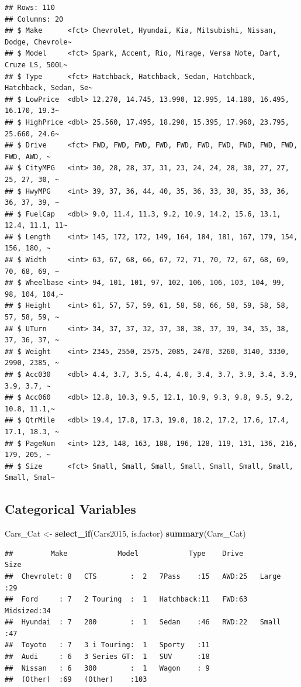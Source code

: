 \documentclass[]{book}
\newenvironment{Shaded}{\begin{snugshade}}{\end{snugshade}}
\newcommand{\KeywordTok}[1]{\textcolor[rgb]{0.13,0.29,0.53}{\textbf{#1}}}
\newcommand{\StringTok}[1]{\textcolor[rgb]{0.31,0.60,0.02}{#1}}
\newcommand{\NormalTok}[1]{#1}
\begin{document}
\begin{verbatim}
## Rows: 110
## Columns: 20
## $ Make      <fct> Chevrolet, Hyundai, Kia, Mitsubishi, Nissan, Dodge, Chevrole~
## $ Model     <fct> Spark, Accent, Rio, Mirage, Versa Note, Dart, Cruze LS, 500L~
## $ Type      <fct> Hatchback, Hatchback, Sedan, Hatchback, Hatchback, Sedan, Se~
## $ LowPrice  <dbl> 12.270, 14.745, 13.990, 12.995, 14.180, 16.495, 16.170, 19.3~
## $ HighPrice <dbl> 25.560, 17.495, 18.290, 15.395, 17.960, 23.795, 25.660, 24.6~
## $ Drive     <fct> FWD, FWD, FWD, FWD, FWD, FWD, FWD, FWD, FWD, FWD, FWD, AWD, ~
## $ CityMPG   <int> 30, 28, 28, 37, 31, 23, 24, 24, 28, 30, 27, 27, 25, 27, 30, ~
## $ HwyMPG    <int> 39, 37, 36, 44, 40, 35, 36, 33, 38, 35, 33, 36, 36, 37, 39, ~
## $ FuelCap   <dbl> 9.0, 11.4, 11.3, 9.2, 10.9, 14.2, 15.6, 13.1, 12.4, 11.1, 11~
## $ Length    <int> 145, 172, 172, 149, 164, 184, 181, 167, 179, 154, 156, 180, ~
## $ Width     <int> 63, 67, 68, 66, 67, 72, 71, 70, 72, 67, 68, 69, 70, 68, 69, ~
## $ Wheelbase <int> 94, 101, 101, 97, 102, 106, 106, 103, 104, 99, 98, 104, 104,~
## $ Height    <int> 61, 57, 57, 59, 61, 58, 58, 66, 58, 59, 58, 58, 57, 58, 59, ~
## $ UTurn     <int> 34, 37, 37, 32, 37, 38, 38, 37, 39, 34, 35, 38, 37, 36, 37, ~
## $ Weight    <int> 2345, 2550, 2575, 2085, 2470, 3260, 3140, 3330, 2990, 2385, ~
## $ Acc030    <dbl> 4.4, 3.7, 3.5, 4.4, 4.0, 3.4, 3.7, 3.9, 3.4, 3.9, 3.9, 3.7, ~
## $ Acc060    <dbl> 12.8, 10.3, 9.5, 12.1, 10.9, 9.3, 9.8, 9.5, 9.2, 10.8, 11.1,~
## $ QtrMile   <dbl> 19.4, 17.8, 17.3, 19.0, 18.2, 17.2, 17.6, 17.4, 17.1, 18.3, ~
## $ PageNum   <int> 123, 148, 163, 188, 196, 128, 119, 131, 136, 216, 179, 205, ~
## $ Size      <fct> Small, Small, Small, Small, Small, Small, Small, Small, Smal~
\end{verbatim}

\subsection{Categorical Variables}\label{categorical-variables}

\begin{Shaded}
\begin{Highlighting}[]
\NormalTok{Cars_Cat <-}\StringTok{ }\KeywordTok{select_if}\NormalTok{(Cars2015, is.factor)}
\KeywordTok{summary}\NormalTok{(Cars_Cat)}
\end{Highlighting}
\end{Shaded}

\begin{verbatim}
##         Make            Model            Type    Drive          Size   
##  Chevrolet: 8   CTS        :  2   7Pass    :15   AWD:25   Large   :29  
##  Ford     : 7   2 Touring  :  1   Hatchback:11   FWD:63   Midsized:34  
##  Hyundai  : 7   200        :  1   Sedan    :46   RWD:22   Small   :47  
##  Toyoto   : 7   3 i Touring:  1   Sporty   :11                         
##  Audi     : 6   3 Series GT:  1   SUV      :18                         
##  Nissan   : 6   300        :  1   Wagon    : 9                         
##  (Other)  :69   (Other)    :103
\end{verbatim}
\end{document}
